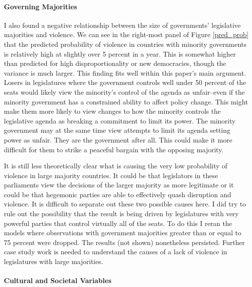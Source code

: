 \documentclass[a4paper]{article}\usepackage[]{graphicx}\usepackage[]{color}
\begin{document}
\paragraph{Governing Majorities}

I also found a negative relationship between the size of governments' legislative majorities and violence. We can see in the right-most panel of Figure \ref{pred_prob} that the predicted probability of violence in countries with minority governments is relatively high at slightly over 5 percent in a year. This is somewhat higher than predicted for high disproportionality or new democracies, though the variance is much larger. This finding fits well within this paper's main argument. Losers in legislatures where the government controls well under 50 percent of the seats would likely view the minority's control of the agenda as unfair--even if the minority government has a constrained ability to affect policy change. This might make them more likely to view changes to how the minority controls the legislative agenda as breaking a commitment to limit its power. The minority government may at the same time view attempts to limit its agenda setting power as unfair. They are the government after all. This could make it more difficult for them to strike a peaceful bargain with the opposing majority. 

It is still less theoretically clear what is causing the very low probability of violence in large majority countries. It could be that legislators in these parliaments view the decisions of the larger majority as more legitimate or it could be that hegemonic parties are able to effectively quash disruption and violence. It is difficult to separate out these two possible causes here. I did try to rule out the possibility that the result is being driven by legislatures with very powerful parties that control virtually all of the seats. To do this I reran the models where observations with government majorities greater than or equal to 75 percent were dropped. The results (not shown) nonetheless persisted. Further case study work is needed to understand the causes of a lack of violence in legislatures with large majorities.

\paragraph{Cultural and Societal Variables}
\end{document}
